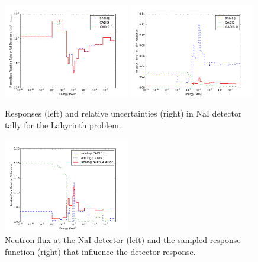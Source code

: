 \documentclass[12pt]{article}
\begin{document}
\begin{figure}
  \begin{center}
    \includegraphics[width=0.49\textwidth]{./images/response.png}
    \includegraphics[width=0.49\textwidth]{./images/response_RE.png}
    \caption[]{\label{fig::tallyresponse} Responses (left) and relative uncertainties (right) in NaI detector tally for the Labyrinth problem. }
  \end{center}
\end{figure}


\begin{figure}
  \begin{center}
    \includegraphics[width=0.49\textwidth]{./images/RE_differences.png}
    \caption[]{\label{fig::rediffs} Neutron flux at the NaI detector (left) and the sampled response function (right) that influence the detector response. }
  \end{center}
\end{figure}
\end{document}
